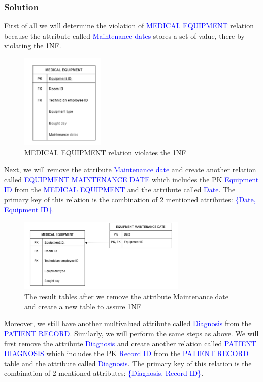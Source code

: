 \documentclass[a4paper]{article}
\numberwithin{equation}{section}
\begin{document}
\subsubsection{Solution}
First of all we will determine the violation of \textcolor{blue}{MEDICAL EQUIPMENT} relation because the attribute called \textcolor{blue}{Maintenance dates} stores a set of value, there by violating the 1NF\@.
\begin{figure}[H]
  \centering
  \includegraphics[width = 4cm ]{assets/1NFviolation.PNG}
  \caption{MEDICAL EQUIPMENT relation violates the 1NF }
\end{figure}

Next, we will remove the attribute \textcolor{blue}{Maintenance date} and create another relation called \textcolor{blue}{EQUIPMENT MAINTENANCE DATE} which includes the PK \textcolor{blue}{Equipment ID} from the \textcolor{blue}{MEDICAL EQUIPMENT} and the attribute called \textcolor{blue}{Date}.
The primary key of this relation is the combination of 2 mentioned attributes: \textcolor{blue}{\{Date, Equipment ID\}}.

\begin{figure}[H]
  \centering
  \includegraphics[width = 8cm ]{assets/1NFsolution.PNG}
  \captionsetup{justification=centering,margin=2cm}
  \caption{The result tables after we remove the attribute Maintenance date and create a new table to assure 1NF }
\end{figure}

Moreover, we still have another multivalued attribute called \textcolor{blue}{Diagnosis} from the \textcolor{blue}{PATIENT RECORD}\@.
Similarly, we will perform the same steps as above.
We will first remove the attribute \textcolor{blue}{Diagnosis} and create another relation called \textcolor{blue}{PATIENT DIAGNOSIS} which includes the PK \textcolor{blue}{Record ID} from the \textcolor{blue}{PATIENT RECORD} table and the attribute called \textcolor{blue}{Diagnosis}.
The primary key of this relation is the combination of 2 mentioned attributes: \textcolor{blue}{\{Diagnosis, Record ID\}}.
\end{document}
